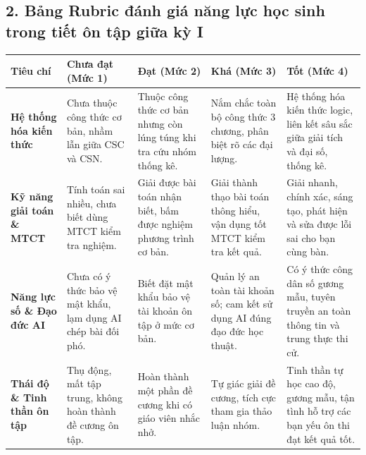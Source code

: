 \documentclass[12pt, a4paper]{article}
\begin{document}
\subsection*{2. Bảng Rubric đánh giá năng lực học sinh trong tiết ôn tập giữa kỳ I}

\begin{center}
\small
\begin{tabularx}{\textwidth}{|p{2.8cm}|X|X|X|X|}
\hline
\textbf{Tiêu chí} & \textbf{Chưa đạt (Mức 1)} & \textbf{Đạt (Mức 2)} & \textbf{Khá (Mức 3)} & \textbf{Tốt (Mức 4)} \\ \hline
\textbf{Hệ thống hóa kiến thức} & Chưa thuộc công thức cơ bản, nhầm lẫn giữa CSC và CSN. & Thuộc công thức cơ bản nhưng còn lúng túng khi tra cứu nhóm thống kê. & Nắm chắc toàn bộ công thức 3 chương, phân biệt rõ các đại lượng. & Hệ thống hóa kiến thức logic, liên kết sâu sắc giữa giải tích và đại số, thống kê. \\ \hline
\textbf{Kỹ năng giải toán \& MTCT} & Tính toán sai nhiều, chưa biết dùng MTCT kiểm tra nghiệm. & Giải được bài toán nhận biết, bấm được nghiệm phương trình cơ bản. & Giải thành thạo bài toán thông hiểu, vận dụng tốt MTCT kiểm tra kết quả. & Giải nhanh, chính xác, sáng tạo, phát hiện và sửa được lỗi sai cho bạn cùng bàn. \\ \hline
\textbf{Năng lực số \& Đạo đức AI} & Chưa có ý thức bảo vệ mật khẩu, lạm dụng AI chép bài đối phó. & Biết đặt mật khẩu bảo vệ tài khoản ôn tập ở mức cơ bản. & Quản lý an toàn tài khoản số; cam kết sử dụng AI đúng đạo đức học thuật. & Có ý thức công dân số gương mẫu, tuyên truyền an toàn thông tin và trung thực thi cử. \\ \hline
\textbf{Thái độ \& Tinh thần ôn tập} & Thụ động, mất tập trung, không hoàn thành đề cương ôn tập. & Hoàn thành một phần đề cương khi có giáo viên nhắc nhở. & Tự giác giải đề cương, tích cực tham gia thảo luận nhóm. & Tinh thần tự học cao độ, gương mẫu, tận tình hỗ trợ các bạn yếu ôn thi đạt kết quả tốt. \\ \hline
\end{tabularx}
\end{center}
\end{document}

